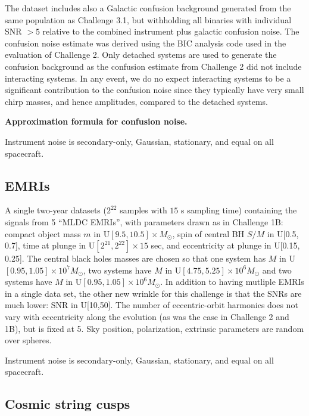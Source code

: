 \documentclass{iopart}
\begin{document}
The dataset includes also a Galactic confusion background generated from the same population as Challenge 3.1, but withholding
all binaries with individual SNR $> 5$ relative to the combined instrument plus galactic confusion
noise. The confusion noise estimate was derived using the BIC analysis code used in the evaluation of Challenge 2.
Only detached systems are used to generate the confusion background as the confusion estimate from Challenge 2 did
not include interacting systems. In any event, we do no expect interacting systems to be a significant contribution
to the confusion noise since they typically have very small chirp masses, and hence amplitudes, compared to the detached systems.

\textbf{Approximation formula for confusion noise.}

Instrument noise is secondary-only, Gaussian, stationary, and equal on all spacecraft.

\subsection{EMRIs}
\label{sec:ch3emri}

A single two-year datasets ($2^{22}$ samples with $15$ s sampling time) containing the signals from 5 ``MLDC EMRIs'', with parameters drawn
as in Challenge 1B: compact object mass $m$ in U$[9.5, 10.5] \times M_{\odot}$, spin of central BH $S/M$ in U[0.5, 0.7], time at plunge
in U$[2^{21}, 2^{22}] \times 15$ sec, and eccentricity at plunge in U[0.15, 0.25]. The central black holes masses are chosen so that
one system has $M$ in U$[0.95, 1.05] \times 10^7 M_{\odot}$, two systems have $M$ in U$[4.75, 5.25] \times 10^6 M_{\odot}$ and
two systems have $M$ in U$[0.95, 1.05] \times 10^6 M_{\odot}$. In addition to having mutliple EMRIs in a single data set, the
other new wrinkle for this challenge is that the SNRs are much lower: SNR in U[10,50].
The number of eccentric-orbit harmonics does not vary with eccentricity
along the evolution (as was the case in Challenge 2 and 1B), but is fixed at 5. Sky position, polarization,
extrinsic parameters are random over spheres.

Instrument noise is secondary-only, Gaussian, stationary, and equal on all spacecraft. 

\subsection{Cosmic string cusps}
\label{sec:ch3string}
\end{document}
